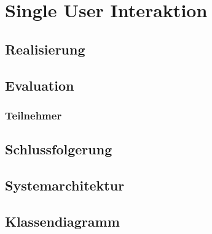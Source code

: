 \chapter{Single User Interaktion}
\label{ch:Single_User_Interaktion}

\section{Realisierung}



\section{Evaluation}

\subsection{Teilnehmer}



\section{Schlussfolgerung}

\section{Systemarchitektur}

\section{Klassendiagramm}